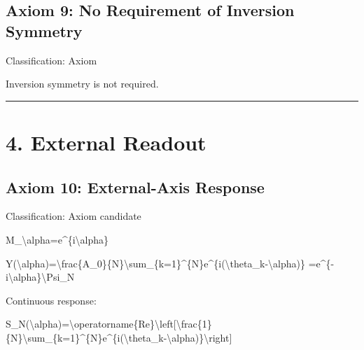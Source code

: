 \documentclass[
  a4paper,
]{article}
\newenvironment{Shaded}{}{}
\newcommand{\NormalTok}[1]{#1}
\begin{document}
\subsection{Axiom 9: No Requirement of Inversion
Symmetry}\label{axiom-9-no-requirement-of-inversion-symmetry}

Classification: Axiom

Inversion symmetry is not required.

\begin{center}\rule{0.5\linewidth}{0.5pt}\end{center}

\section{4. External Readout}\label{external-readout}

\subsection{Axiom 10: External-Axis
Response}\label{axiom-10-external-axis-response}

Classification: Axiom candidate

\begin{Shaded}
\begin{Highlighting}[]
\NormalTok{M\_\textbackslash{}alpha=e\^{}\{i\textbackslash{}alpha\}}
\end{Highlighting}
\end{Shaded}

\begin{Shaded}
\begin{Highlighting}[]
\NormalTok{Y(\textbackslash{}alpha)=\textbackslash{}frac\{A\_0\}\{N\}\textbackslash{}sum\_\{k=1\}\^{}\{N\}e\^{}\{i(\textbackslash{}theta\_k{-}\textbackslash{}alpha)\}}
\NormalTok{=e\^{}\{{-}i\textbackslash{}alpha\}\textbackslash{}Psi\_N}
\end{Highlighting}
\end{Shaded}

Continuous response:

\begin{Shaded}
\begin{Highlighting}[]
\NormalTok{S\_N(\textbackslash{}alpha)=\textbackslash{}operatorname\{Re\}\textbackslash{}left[\textbackslash{}frac\{1\}\{N\}\textbackslash{}sum\_\{k=1\}\^{}\{N\}e\^{}\{i(\textbackslash{}theta\_k{-}\textbackslash{}alpha)\}\textbackslash{}right]}
\end{Highlighting}
\end{Shaded}
\end{document}
